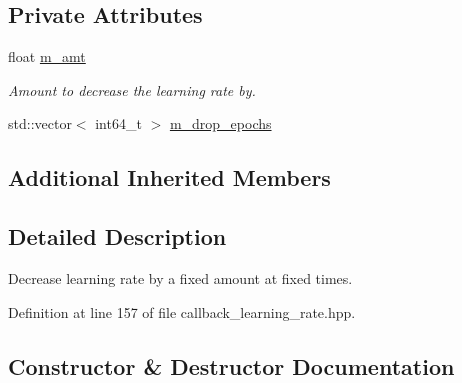 \subsection*{Private Attributes}
\begin{DoxyCompactItemize}
\item 
float \hyperlink{classlbann_1_1lbann__callback__drop__fixed__learning__rate_a3e38dc2b7dc92d29567091395de22546}{m\+\_\+amt}
\begin{DoxyCompactList}\small\item\em Amount to decrease the learning rate by. \end{DoxyCompactList}\item 
std\+::vector$<$ int64\+\_\+t $>$ \hyperlink{classlbann_1_1lbann__callback__drop__fixed__learning__rate_afc99419c3d818fe86d5865c8f7beae49}{m\+\_\+drop\+\_\+epochs}
\end{DoxyCompactItemize}
\subsection*{Additional Inherited Members}


\subsection{Detailed Description}
Decrease learning rate by a fixed amount at fixed times. 

Definition at line 157 of file callback\+\_\+learning\+\_\+rate.\+hpp.



\subsection{Constructor \& Destructor Documentation}
\mbox{\label{classlbann_1_1lbann__callback__drop__fixed__learning__rate_a28f58eb50813e638d865179d645908f2}} 
